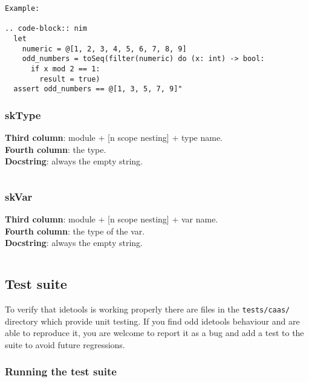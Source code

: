 \begin{verbatim}
Example:

.. code-block:: nim
  let
    numeric = @[1, 2, 3, 4, 5, 6, 7, 8, 9]
    odd_numbers = toSeq(filter(numeric) do (x: int) -> bool:
      if x mod 2 == 1:
        result = true)
  assert odd_numbers == @[1, 3, 5, 7, 9]"
\end{verbatim}

\hypertarget{sktype}{%
\subsubsection{skType}\label{sktype}}

\textbf{Third column}: module + {[}n scope nesting{]} + type name.\\
\textbf{Fourth column}: the type.\\
\textbf{Docstring}: always the empty string.

\begin{verbatim}
\end{verbatim}

\hypertarget{skvar}{%
\subsubsection{skVar}\label{skvar}}

\textbf{Third column}: module + {[}n scope nesting{]} + var name.\\
\textbf{Fourth column}: the type of the var.\\
\textbf{Docstring}: always the empty string.

\begin{verbatim}
\end{verbatim}

\hypertarget{test-suite}{%
\subsection{Test suite}\label{test-suite}}

To verify that idetools is working properly there are files in the
\texttt{tests/caas/} directory which provide unit testing. If you find
odd idetools behaviour and are able to reproduce it, you are welcome to
report it as a bug and add a test to the suite to avoid future
regressions.

\hypertarget{running-the-test-suite}{%
\subsubsection{Running the test suite}\label{running-the-test-suite}}

